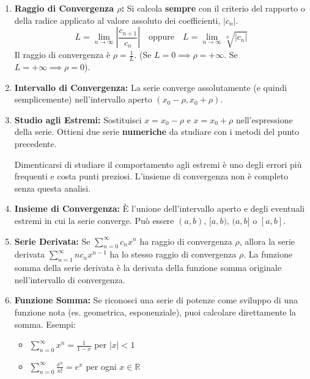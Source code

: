 \begin{enumerate}
    \item \textbf{Raggio di Convergenza $\rho$:} Si calcola \textbf{sempre} con il criterio del rapporto o della radice applicato al valore assoluto dei coefficienti, $|c_n|$. 
    \[ L = \lim_{n \to \infty} \left|\frac{c_{n+1}}{c_n}\right| \quad \text{oppure} \quad L = \lim_{n \to \infty} \sqrt[n]{|c_n|} \]
    Il raggio di convergenza è $\rho = \frac{1}{L}$. (Se $L=0 \implies \rho=+\infty$. Se $L=+\infty \implies \rho=0$). 
    \item \textbf{Intervallo di Convergenza:} La serie converge assolutamente (e quindi semplicemente) nell'intervallo aperto $(x_0 - \rho, x_0 + \rho)$. 
    \item \textbf{Studio agli Estremi:} Sostituisci $x = x_0 - \rho$ e $x = x_0 + \rho$ nell'espressione della serie. Ottieni due serie \textbf{numeriche} da studiare con i metodi del punto precedente. 
    \begin{errore}
    Dimenticarsi di studiare il comportamento agli estremi è uno degli errori più frequenti e costa punti preziosi. L'insieme di convergenza non è completo senza questa analisi. 
    \end{errore}
    \item \textbf{Insieme di Convergenza:} È l'unione dell'intervallo aperto e degli eventuali estremi in cui la serie converge. Può essere $(a,b)$, $[a,b)$, $(a,b]$ o $[a,b]$. 
    \item \textbf{Serie Derivata:} Se $\sum_{n=0}^{\infty} c_n x^n$ ha raggio di convergenza $\rho$, allora la serie derivata $\sum_{n=1}^{\infty} n c_n x^{n-1}$ ha lo stesso raggio di convergenza $\rho$. La funzione somma della serie derivata è la derivata della funzione somma originale nell'intervallo di convergenza.
    \item \textbf{Funzione Somma:} Se riconosci una serie di potenze come sviluppo di una funzione nota (es. geometrica, esponenziale), puoi calcolare direttamente la somma. Esempi:
    \begin{itemize}
        \item $\sum_{n=0}^{\infty} x^n = \frac{1}{1-x}$ per $|x| < 1$
        \item $\sum_{n=0}^{\infty} \frac{x^n}{n!} = e^x$ per ogni $x \in \mathbb{R}$
    \end{itemize}
\end{enumerate}

